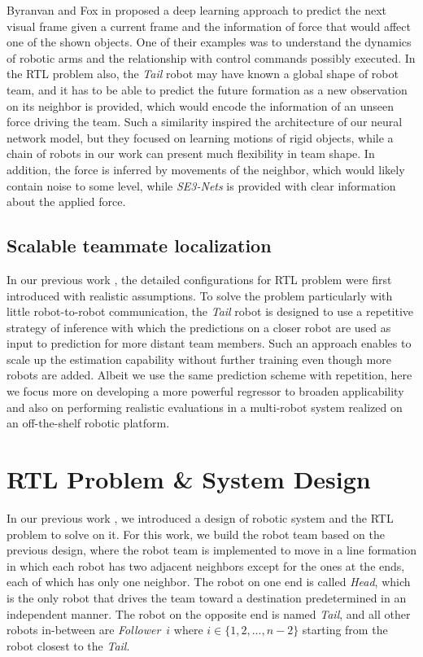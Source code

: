 \documentclass[letterpaper, 10 pt, conference]{ieeeconf}  %
\begin{document}
	Byranvan and Fox in \cite{BF17} proposed a deep learning approach 
	to predict the next visual frame given a current frame and the information 
	of force that would affect one of the shown objects. One of their examples was 
	to understand the dynamics of robotic arms and the relationship with control 
	commands possibly executed. In the RTL problem also, the \emph{Tail} robot may 
	have known 
	a global shape of robot team, and it has to be able to predict the future 
	formation as a new observation on its neighbor is provided, which would encode 
	the information of an unseen force driving the team. Such a similarity inspired 
	the architecture of our neural network model, but they focused on learning 
	motions of rigid objects, while a chain of robots in our work can present 
	much flexibility in team shape. In addition, the force is inferred by 
	movements of the neighbor, which would likely contain noise to some level, while 
	\emph{SE3-Nets} is provided with clear information about the applied force.  
	
	\subsection{Scalable teammate localization} 
	\label{sec:scalable_teammate_localization}
	
	In our previous work \cite{CPR17}, the detailed configurations for RTL 
	problem were first introduced with realistic assumptions. 
	To solve the problem particularly with little robot-to-robot communication, 
	the \emph{Tail} robot is designed to use a repetitive strategy of inference 
	with which the predictions on a closer robot are used as input to 
	prediction for more distant team members. Such an approach enables to scale 
	up the estimation capability without further training even though more robots are 
	added. Albeit we use the same prediction scheme with repetition, here we focus 
	more on developing a more powerful regressor to broaden applicability and 
	also on performing realistic evaluations in a multi-robot system realized on 
	an off-the-shelf robotic platform. 
	
	
	\section{RTL Problem \& System Design} 
	\label{sec:rtl_problem}
	
	In our previous work \cite{CPR17} , we introduced a design of robotic system and the RTL
	problem to solve on it. 
	For this work, we build the robot team based on the previous design, where 
	the robot team is implemented to move in a line formation 
	in which each robot has two adjacent neighbors except for the ones at the ends, 
	each of which has only one neighbor. 
	The robot on one end is called \emph{Head}, which is the only robot that 
	drives the team toward a destination predetermined in an independent manner.
	The robot on the opposite end is named \emph{Tail}, and all other robots 
	in-between are \emph{Follower}~$i$ where $i \in \{1, 2, ..., n-2\}$ starting
	from the robot closest to the \emph{Tail}. 
	 
\end{document}

